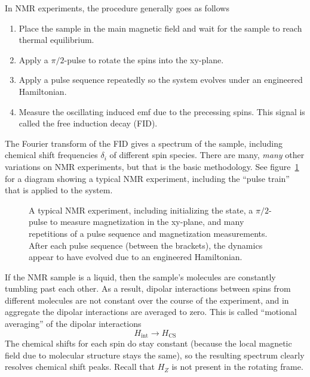 In NMR experiments, the procedure generally goes as follows
\begin{enumerate}
    \item Place the sample in the main magnetic field and wait for the sample to reach thermal equilibrium.
    \item Apply a $\pi/2$-pulse to rotate the spins into the xy-plane.
    \item Apply a pulse sequence repeatedly so the system evolves under an engineered Hamiltonian.
    \item Measure the oscillating induced emf due to the precessing spins. This signal is called the free induction decay (FID).
\end{enumerate}
The Fourier transform of the FID gives a spectrum of the sample, including chemical shift frequencies $\delta_i$ of different spin species. There are many, \emph{many} other variations on NMR experiments, but that is the basic methodology. See figure~\ref{fig:NMR-Pulse-Train} for a diagram showing a typical NMR experiment, including the ``pulse train'' that is applied to the system.

\begin{figure}[H]
    \centering
    
    \caption{A typical NMR experiment, including initializing the state, a $\pi/2$-pulse to measure magnetization in the xy-plane, and many repetitions of a pulse sequence and magnetization measurements. After each pulse sequence (between the brackets), the dynamics appear to have evolved due to an engineered Hamiltonian.}
    \label{fig:NMR-Pulse-Train}
\end{figure}


If the NMR sample is a liquid, then the sample's molecules are constantly tumbling past each other. As a result, dipolar interactions between spins from different molecules are not constant over the course of the experiment, and in aggregate the dipolar interactions are averaged to zero. This is called ``motional averaging'' of the dipolar interactions
\[
H_{\text{int}} \longrightarrow H_\text{CS}
\]
The chemical shifts for each spin do stay constant (because the local magnetic field due to molecular structure stays the same), so the resulting spectrum clearly resolves chemical shift peaks. Recall that $H_Z$ is not present in the rotating frame.

